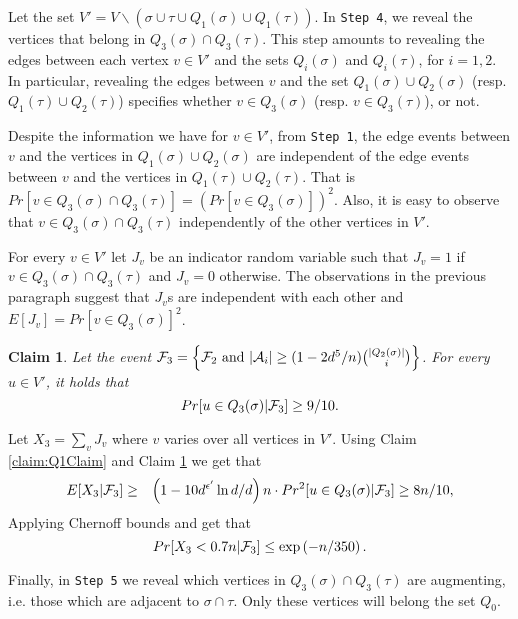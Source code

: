 \documentclass[a4paper,10pt]{article}
\newtheorem{claim}{Claim}\renewcommand{\theclaim}{\arabic{claim}}
\begin{document}
Let the set $V'=V\backslash (\sigma \cup \tau \cup Q_{1}(\sigma)\cup Q_{1}(\tau))$.
In {\tt Step 4}, we reveal the vertices that belong in $Q_3(\sigma)\cap Q_3(\tau)$.
This step amounts to revealing the edges between each vertex  $v\in V'$ 
and the sets $Q_i(\sigma)$ and $Q_i(\tau)$, for $i=1,2$.
In particular, revealing the edges between $v$ and the set $Q_1(\sigma)\cup Q_2(\sigma)$
(resp. $Q_1(\tau)\cup Q_2(\tau)$) specifies whether $v\in Q_3(\sigma)$
(resp. $v\in Q_3(\tau)$), or not.

Despite the information we have for $v\in V'$, from {\tt Step 1}, the edge
events between $v$ and the vertices in $Q_1(\sigma)\cup Q_2(\sigma)$ are 
independent of the edge events between $v$ and the vertices in
$Q_1(\tau)\cup Q_2(\tau)$. That is 
$Pr[v\in Q_3(\sigma)\cap Q_3(\tau)]=(Pr[v\in Q_3(\sigma)])^2$.
Also, it is easy to observe that $v\in Q_3(\sigma)\cap Q_3(\tau)$
independently of the other vertices in $V'$.



For every $v \in V'$ let $J_v$ be an indicator random variable such that
$J_v=1$ if $v\in Q_3(\sigma)\cap Q_3(\tau)$ and $J_v=0$ otherwise.
The observations in the previous paragraph suggest that $J_v$s  
are independent with each other and $E[J_v]=Pr[v \in Q_3(\sigma)]^2$. 



\begin{claim}\label{Lemma:Q3}
Let the event  ${\cal F}_3=\left \{ {\cal F}_2 \textrm{ and }
 |{\cal A}_i| \geq (1-2d^5/n){|Q_2(\sigma)|\choose i}\right\}$.
For every $u \in V'$, it holds that $$Pr[u \in Q_3(\sigma)|{\cal F}_3] \geq 9/10.$$
\end{claim}

\noindent
Let $X_3=\sum_{v}J_v$ where $v$ varies over all vertices in $V'$.  
Using Claim \ref{claim:Q1Claim}  and Claim \ref{Lemma:Q3} we get that
\begin{eqnarray*}
E[X_3|{\cal F}_3]&\geq& \left(1-{10d^{\epsilon'}\ln d}/{d}\right)n
\cdot Pr^2[u \in Q_3(\sigma)|{\cal F}_3]
\geq 8n/10,
\end{eqnarray*}
Applying Chernoff bounds and get that 
\begin{equation}\label{eq:X3Chernoff}
Pr[X_3 < 0.7 n|{\cal F}_3 ]\leq \exp \left(-n/{350} \right).
\end{equation}


\noindent
Finally, in {\tt Step 5} we reveal which vertices in $Q_3(\sigma)\cap Q_3(\tau)$
are augmenting, i.e. those which are adjacent to $\sigma\cap \tau$.
Only these vertices will belong the set $Q_0$.
\end{document}
